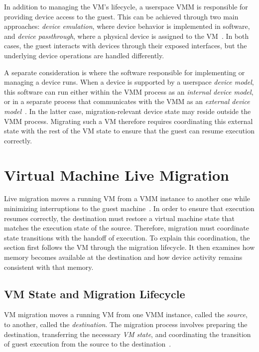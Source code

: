 In addition to managing the VM's lifecycle, a userspace VMM is responsible for 
providing device access to the guest. This can be achieved through two main approaches: 
\emph{device emulation}, where device behavior is implemented in software, and 
\emph{device passthrough}, where a physical device is assigned to the VM~\cite{bellard2005qfa,santos2008io}. 
In both cases, the guest interacts with devices through their exposed interfaces, 
but the underlying device operations are handled differently.

A separate consideration is where the software responsible for implementing or 
managing a device runs. When a device is supported by a userspace \emph{device model}, 
this software can run either within the VMM process as an \emph{internal device model}, 
or in a separate process that communicates with the VMM as an 
\emph{external device model}~\cite{johnson2021vfio}. In the latter case, migration-relevant 
device state may reside outside the VMM process. Migrating such a VM therefore 
requires coordinating this external state with the rest of the VM state to ensure 
that the guest can resume execution correctly.

\section{Virtual Machine Live Migration}
\label{sec:state:live-migration}

Live migration moves a running VM from a VMM instance to another one while minimizing 
interruptions to the guest machine~\cite{clark2005migration}. In order to ensure that 
execution resumes correctly, the destination must restore a virtual machine state 
that matches the execution state of the source. Therefore, migration must 
coordinate state transitions with the handoff of execution.
To explain this coordination, the section first follows the VM through the
migration lifecycle. It then examines how memory becomes available at the
destination and how device activity remains consistent with that memory.

\subsection{VM State and Migration Lifecycle}
\label{sec:state:migration-lifecycle}

VM migration moves a running VM from one VMM instance, called the \emph{source}, 
to another, called the \emph{destination}. The migration process involves 
preparing the destination, transferring the necessary \emph{VM state}, and coordinating 
the transition of guest execution from the source to the destination~\cite{qemu-migration-framework}.

